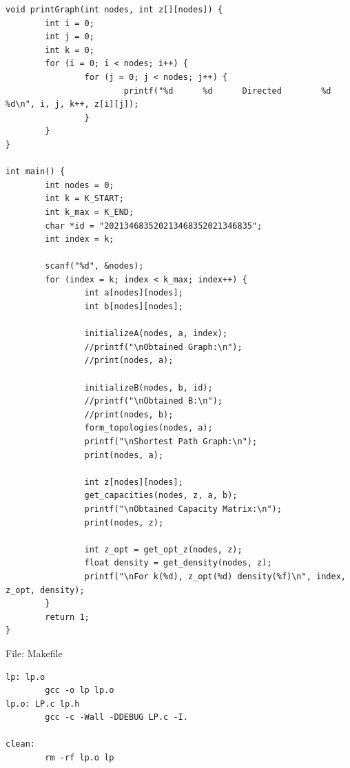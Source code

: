 \documentclass[11pt]{article}
\begin{document}
\begin{lstlisting}
void printGraph(int nodes, int z[][nodes]) {
        int i = 0;
        int j = 0;
        int k = 0;
        for (i = 0; i < nodes; i++) {
                for (j = 0; j < nodes; j++) {
                        printf("%d      %d      Directed        %d      %d\n", i, j, k++, z[i][j]);
                }
        }
}

int main() {
        int nodes = 0;
        int k = K_START;
        int k_max = K_END;
        char *id = "202134683520213468352021346835";
        int index = k;

        scanf("%d", &nodes);
        for (index = k; index < k_max; index++) {
                int a[nodes][nodes];
                int b[nodes][nodes];

                initializeA(nodes, a, index);
                //printf("\nObtained Graph:\n");
                //print(nodes, a);

                initializeB(nodes, b, id);
                //printf("\nObtained B:\n");
                //print(nodes, b);
                form_topologies(nodes, a);
                printf("\nShortest Path Graph:\n");
                print(nodes, a);

                int z[nodes][nodes];
                get_capacities(nodes, z, a, b);
                printf("\nObtained Capacity Matrix:\n");
                print(nodes, z);

                int z_opt = get_opt_z(nodes, z);
                float density = get_density(nodes, z);
                printf("\nFor k(%d), z_opt(%d) density(%f)\n", index, z_opt, density);
        }
        return 1;
}

\end{lstlisting}
File: Makefile
\begin{lstlisting}
lp: lp.o
        gcc -o lp lp.o
lp.o: LP.c lp.h
        gcc -c -Wall -DDEBUG LP.c -I.

clean:
        rm -rf lp.o lp
\end{lstlisting}
\end{document}
